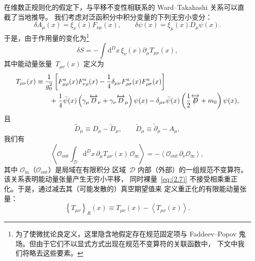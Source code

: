 在维数正规则化的假定下，与平移不变性相联系的 Ward--Takahashi 关系可以直截了当地推导。
我们考虑对泛函积分中积分变量的下列无穷小变分：
\begin{equation}
   \delta A_\mu(x)=\xi_\nu(x)F_{\nu\mu}(x),\qquad
   \delta\psi(x)=\xi_\mu(x)D_\mu\psi(x).
\label{eq:(2.5)}
\end{equation}
于是，由于作用量的变化为\footnote{为了使微扰论良定义，这里隐含地假定存在规范固定项与
Faddeev--Popov 鬼场。但由于它们不以显式方式出现在规范不变算符的关联函数中，
下文中我们将略去这些要素。}
\begin{equation}
   \delta S=-\int\mathrm{d}^Dx\,\xi_\nu(x)\partial_\mu T_{\mu\nu}(x),
\label{eq:(2.6)}
\end{equation}
其中能动量张量~$T_{\mu\nu}(x)$ 定义为
\begin{align}
   T_{\mu\nu}(x)
   &\equiv\frac{1}{g_0^2}\left[
   F_{\mu\rho}^a(x)F_{\nu\rho}^a(x)
   -\frac{1}{4}\delta_{\mu\nu}F_{\rho\sigma}^a(x)F_{\rho\sigma}^a(x)
   \right]
\notag\\
   &\qquad{}
   +\frac{1}{4}
   \Bar{\psi}(x)\left(\gamma_\mu\overleftrightarrow{D}_\nu
   +\gamma_\nu\overleftrightarrow{D}_\mu\right)\psi(x)
   -\delta_{\mu\nu}\Bar{\psi}(x)
   \left(\frac{1}{2}\overleftrightarrow{\Slash{D}}
   +m_0\right)\psi(x),
\label{eq:(2.7)}
\end{align}
且
\begin{equation}
   \overleftrightarrow{D}_\mu\equiv D_\mu-\overleftarrow{D}_\mu,\qquad
   \overleftarrow{D}_\mu\equiv\overleftarrow{\partial}_\mu-A_\mu,
\label{eq:(2.8)}
\end{equation}
我们有
\begin{equation}
   \left\langle\mathcal{O}_{\text{out}}
   \int_{\mathcal{D}}
   \mathrm{d}^Dx\,\partial_\mu T_{\mu\nu}(x)\,\mathcal{O}_{\text{in}}\right\rangle
   =-\left\langle\mathcal{O}_{\text{out}}\,\partial_\nu\mathcal{O}_{\text{in}}
   \right\rangle,
\label{eq:(2.9)}
\end{equation}
其中 $\mathcal{O}_{\text{in}}$（$\mathcal{O}_{\text{out}}$）是局域在有限积分
区域~$\mathcal{D}$ 内部（外部）的一组规范不变算符。该关系表明能动量张量产生无穷小平移，
同时裸量~\eqref{eq:(2.7)} 不接受相乘重正化。于是，通过减去其（可能发散的）真空期望值来
定义重正化的有限能动量张量：
\begin{equation}
   \left\{T_{\mu\nu}\right\}_R(x)
   \equiv T_{\mu\nu}(x)-\left\langle T_{\mu\nu}(x)\right\rangle.
\label{eq:(2.10)}
\end{equation}

